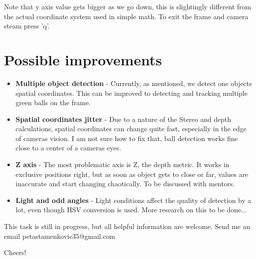 \documentclass{article}
\begin{document}
Note that y axis value gets bigger as we go down, this is slightingly different from the actual coordinate system used in simple math. To exit the frame and camera steam press 'q'.

\newpage

\section{\textbf{Possible improvements}}

\begin{itemize}
    \item \textbf{Multiple object detection} - Currently, as mentioned, we detect one objects spatial coordinates. This can be improved to detecting and tracking multiple green balls on the frame.

    \item \textbf{Spatial coordinates jitter} - Due to a nature of the Stereo and depth calculations, spatial coordinates can change quite fast, especially in the edge of cameras vision. I am not sure how to fix that, ball detection works fine close to a center of a cameras eyes. 

    \item \textbf{Z axis} - The most problematic axis is Z, the depth metric. It works in exclusive positions right, but as soon as object gets to close or far, values are inaccurate and start changing chaotically. To be discussed with mentors. 

    \item \textbf{Light and odd angles} - Light conditions affect the quality of detection by a lot, even though HSV conversion is used. More research on this to be done...
\end{itemize}

This task is still in progress, but all helpful information are welcome. Send me an email petastamenkovic35@gmail.com

Cheers!
\end{document}
